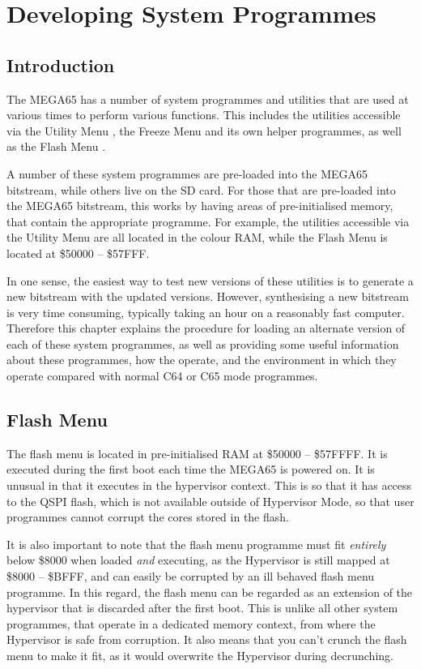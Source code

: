 \chapter{Developing System Programmes}

\section{Introduction}

The MEGA65 has a number of system programmes and utilities that are used at various times to perform various functions.
This includes the utilities accessible via the Utility Menu , the Freeze Menu  and
its own helper programmes, as well as the Flash Menu .

A number of these system programmes are pre-loaded into the MEGA65 bitstream, while others live on the SD card.
For those that are pre-loaded into the MEGA65 bitstream, this works by having areas of pre-initialised memory, that
contain the appropriate programme.  For example, the utilities accessible via the Utility Menu are all located in
the colour RAM, while the Flash Menu is located at \$50000 -- \$57FFF.

In one sense, the easiest way to test new versions of these utilities is to generate a new bitstream with the updated versions.
However, synthesising a new bitstream is very time consuming, typically taking an hour on a reasonably fast computer.
Therefore this chapter explains the procedure for loading an alternate version of each of these system programmes, as well as
providing some useful information about these programmes, how the operate, and the environment in which they operate compared
with normal C64 or C65 mode programmes.

\section{Flash Menu}

The flash menu is located in pre-initialised RAM at \$50000 -- \$57FFFF.  It is executed during the first boot each time the
MEGA65 is powered on.  It is unusual in that it executes in the hypervisor context. This is so that it has access to the QSPI
flash, which is not available outside of Hypervisor Mode, so that user programmes cannot corrupt the cores stored in the flash.

It is also important to note that the flash menu programme must fit {\em entirely} below \$8000 when loaded {\em and} executing, as the Hypervisor is still mapped at \$8000 -- \$BFFF, and can easily be corrupted by an ill behaved flash menu programme.  In this regard, the flash menu
can be regarded as an extension of the hypervisor that is discarded after the first boot.
This is unlike all other system programmes, that operate in a dedicated memory context, from where the Hypervisor is safe from corruption. It also means that you can't crunch the flash menu to make it fit, as it would overwrite the Hypervisor during decrunching.

